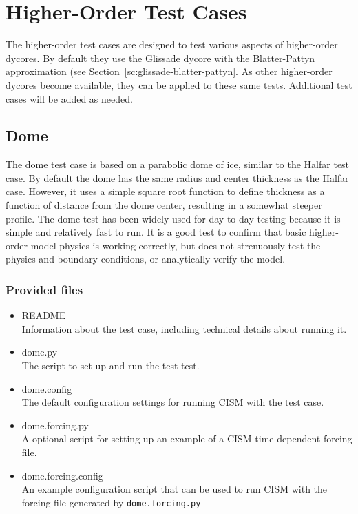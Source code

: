 
\section{Higher-Order Test Cases}
\label{sc:ho-tests}

The higher-order test cases are designed to test various aspects of higher-order dycores.
By default they use the Glissade dycore with the Blatter-Pattyn approximation 
(see Section~\ref{sc:glissade-blatter-pattyn}.
As other higher-order dycores become available, they can be applied
to these same tests. Additional test cases will be added as needed.

\subsection{Dome}
The dome test case is based on a parabolic dome of ice, similar to the Halfar test case.
By default the dome has the same radius and center thickness as the Halfar case.
However, it uses a simple square root function to define thickness as a function 
of distance from the dome center, resulting in a somewhat steeper profile.  
The dome test has been widely used for day-to-day testing
because it is simple and relatively fast to run.  It is a good test
to confirm that basic higher-order model physics is working correctly, but does
not strenuously test the physics and boundary conditions, or analytically verify the model.

\subsubsection{Provided files}

\begin{itemize}
	\item README \\
		Information about the test case, including technical details about running it.
	\item dome.py \\
		The script to set up and run the test test.
 	 \item dome.config \\
  		The default configuration settings for running CISM with the test case.
	\item dome.forcing.py \\
		A optional script for setting up an example of a CISM time-dependent forcing file.
  	\item dome.forcing.config \\
  		An example configuration script that can be used to run CISM with the forcing file
  		generated by \texttt{dome.forcing.py}
\end{itemize}

